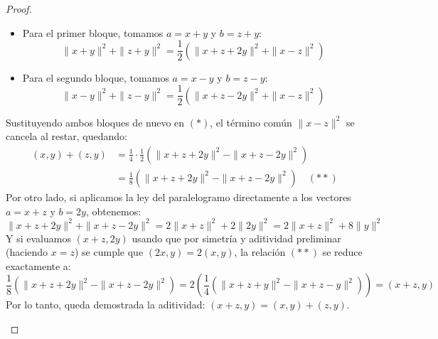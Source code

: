 \begin{teo}
\begin{proof}
\begin{description}
\begin{itemize}
            \begin{itemize}
                \item Para el primer bloque, tomamos $a = x+y$ y $b = z+y$:
                \begin{equation*}
                    \|x+y\|^2 + \|z+y\|^2 = \frac{1}{2} \left( \|x+z+2y\|^2 + \|x-z\|^2 \right)
                \end{equation*}
                \item Para el segundo bloque, tomamos $a = x-y$ y $b = z-y$:
                \begin{equation*}
                    \|x-y\|^2 + \|z-y\|^2 = \frac{1}{2} \left( \|x+z-2y\|^2 + \|x-z\|^2 \right)
                \end{equation*}
            \end{itemize}
            Sustituyendo ambos bloques de nuevo en $(*)$, el término común $\|x-z\|^2$ se cancela al restar, quedando:
            \begin{align*}
                (x, y) + (z, y) &= \frac{1}{4} \cdot \frac{1}{2} \left( \|x+z+2y\|^2 - \|x+z-2y\|^2 \right) \\
                &= \frac{1}{8} \left( \|x+z+2y\|^2 - \|x+z-2y\|^2 \right) \quad (**)
            \end{align*}
            Por otro lado, si aplicamos la ley del paralelogramo directamente a los vectores $a = x+z$ y $b = 2y$, obtenemos:
            \begin{equation*}
                \|x+z+2y\|^2 + \|x+z-2y\|^2 = 2\|x+z\|^2 + 2\|2y\|^2 = 2\|x+z\|^2 + 8\|y\|^2
            \end{equation*}
            Y si evaluamos $(x+z, 2y)$ usando que por simetría y aditividad preliminar (haciendo $x=z$) se cumple que $(2x, y) = 2(x,y)$, la relación $(**)$ se reduce exactamente a:
            \begin{equation*}
                \frac{1}{8} \left( \|x+z+2y\|^2 - \|x+z-2y\|^2 \right) = 2 \left( \frac{1}{4} \left( \|x+z+y\|^2 - \|x+z-y\|^2 \right) \right) = (x+z, y)
            \end{equation*}
            Por lo tanto, queda demostrada la aditividad: $(x+z, y) = (x, y) + (z, y)$.


\end{itemize}
\end{description}
\end{proof}
\end{teo}
